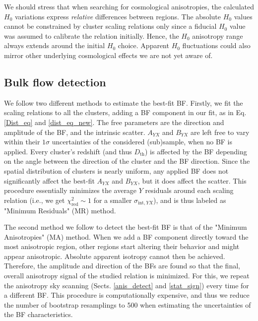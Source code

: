 \documentclass{aa}   %
\begin{document}
We should stress that when searching for cosmological anisotropies, the calculated $H_0$ variations express \emph{relative} differences between regions. The absolute $H_0$ values cannot be constrained by cluster scaling relations only since a fiducial $H_0$ value was assumed to calibrate the relation initially. Hence, the $H_0$ anisotropy range always extends around the initial $H_0$ choice. Apparent $H_0$ fluctuations could also mirror other underlying cosmological effects we are not yet aware of. 

\subsection{Bulk flow detection}\label{BF_detect}

We follow two different methods to estimate the best-fit BF. Firstly, we fit the scaling relations to all the clusters, adding a BF component in our fit, as in Eq. \ref{Dist_eq} and \ref{dist_eq_new}. The free parameters are the direction and amplitude of the BF, and the intrinsic scatter. $A_{YX}$ and $B_{YX}$ are left free to vary within their $1\sigma$ uncertainties of the considered (sub)sample, when no BF is applied. Every cluster's redshift (and thus $D_{\text{th}}$) is affected by the BF depending on the angle between the direction of the cluster and the BF direction. Since the spatial distribution of clusters is nearly uniform, any applied BF does not significantly affect the best-fit $A_{YX}$ and $B_{YX}$, but it does affect the scatter. This procedure essentially minimizes the average $Y$ residuals around each scaling relation (i.e., we get $\chi^2_{\text{red}}\sim 1$ for a smaller $\sigma_{\text{int},YX}$), and is thus labeled as "Minimum Residuals" (MR) method.  

The second method we follow to detect the best-fit BF is that of the "Minimum Anisotropies" (MA) method. When we add a BF component directly toward the most anisotropic region, other regions start altering their behavior and might appear anisotropic. Absolute apparent isotropy cannot then be achieved. Therefore, the amplitude and direction of the BFs are found so that the final, overall anisotropy signal of the studied relation is minimized. For this, we repeat the anisotropy sky scanning (Sects. \ref{anis_detect} and \ref{stat_sign}) every time for a different BF. This procedure is computationally expensive, and thus we reduce the number of bootstrap resamplings to 500 when estimating the uncertainties of the BF characteristics.
\end{document}
